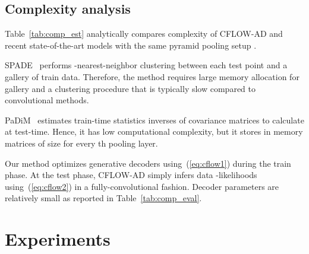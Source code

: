 \documentclass[10pt,twocolumn,letterpaper]{article}
\begin{document}
\subsection{Complexity analysis}
\label{sec:our_complexity}
Table~\ref{tab:comp_est} analytically compares complexity of CFLOW-AD and recent state-of-the-art models with the same pyramid pooling setup \ie .

SPADE~\cite{cohen2021subimage} performs -nearest-neighbor clustering between each test point  and a gallery  of train data. Therefore, the method requires large memory allocation for gallery  and a clustering procedure that is typically slow compared to convolutional methods.

PaDiM~\cite{defard2020padim} estimates train-time statistics \ie inverses of covariance matrices  to calculate   at test-time. Hence, it has low computational complexity, but it stores in memory  matrices of  size for every th pooling layer.

Our method optimizes generative decoders  using~(\ref{eq:cflow1}) during the train phase. At the test phase, CFLOW-AD simply infers data -likelihoods  using~(\ref{eq:cflow2}) in a fully-convolutional fashion. Decoder parameters  are relatively small as reported in Table~\ref{tab:comp_eval}.

\section{Experiments}
\label{sec:eval}
\end{document}
